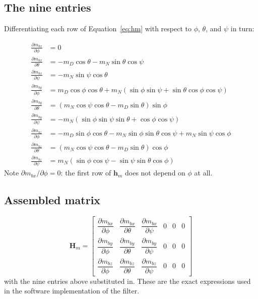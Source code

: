 \documentclass[12pt,a4paper]{article}
\begin{document}
{\subsection{The nine entries}

Differentiating each row of Equation~\eqref{eq:hm} with respect to
$\phi$, $\theta$, and $\psi$ in turn:

\begin{align}
  \frac{\partial m_{bx}}{\partial \phi} &= 0 \\
  \frac{\partial m_{bx}}{\partial \theta} &= -m_D\cos\theta - m_N\sin\theta\cos\psi \\
  \frac{\partial m_{bx}}{\partial \psi} &= -m_N\sin\psi\cos\theta \\[8pt]
  \frac{\partial m_{by}}{\partial \phi} &= m_D\cos\phi\cos\theta + m_N(\sin\phi\sin\psi + \sin\theta\cos\phi\cos\psi) \\
  \frac{\partial m_{by}}{\partial \theta} &= (m_N\cos\psi\cos\theta - m_D\sin\theta)\sin\phi \\
  \frac{\partial m_{by}}{\partial \psi} &= -m_N(\sin\phi\sin\psi\sin\theta + \cos\phi\cos\psi) \\[8pt]
  \frac{\partial m_{bz}}{\partial \phi} &= -m_D\sin\phi\cos\theta - m_N\sin\phi\sin\theta\cos\psi + m_N\sin\psi\cos\phi \\
  \frac{\partial m_{bz}}{\partial \theta} &= (m_N\cos\psi\cos\theta - m_D\sin\theta)\cos\phi \\
  \frac{\partial m_{bz}}{\partial \psi} &= m_N(\sin\phi\cos\psi - \sin\psi\sin\theta\cos\phi)
\end{align}
Note $\partial m_{bx}/\partial \phi = 0$: the first row of $\bm{h}_m$
does not depend on $\phi$ at all.

\subsection{Assembled matrix}

\begin{equation}
  \bm{H}_m =
  \begin{bmatrix}
    \dfrac{\partial m_{bx}}{\partial \phi} & \dfrac{\partial m_{bx}}{\partial \theta} & \dfrac{\partial m_{bx}}{\partial \psi} & 0 & 0 & 0 \\[8pt]
    \dfrac{\partial m_{by}}{\partial \phi} & \dfrac{\partial m_{by}}{\partial \theta} & \dfrac{\partial m_{by}}{\partial \psi} & 0 & 0 & 0 \\[8pt]
    \dfrac{\partial m_{bz}}{\partial \phi} & \dfrac{\partial m_{bz}}{\partial \theta} & \dfrac{\partial m_{bz}}{\partial \psi} & 0 & 0 & 0
  \end{bmatrix}
  \label{eq:Hm-explicit}
\end{equation}
with the nine entries above substituted in. These are the exact
expressions used in the software implementation of the filter.


}
\end{document}
